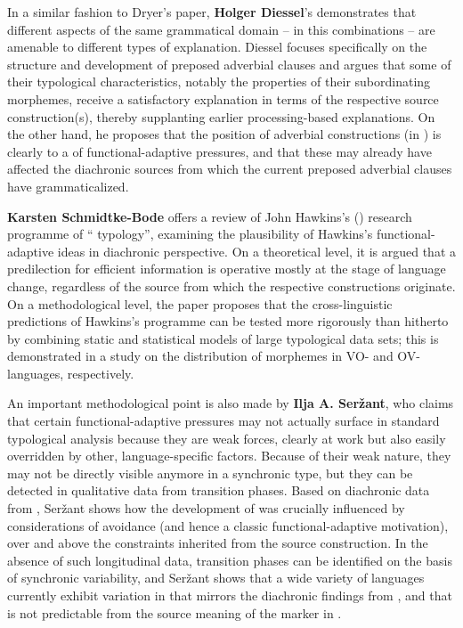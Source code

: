 \documentclass[output=paper]{langsci/langscibook}
\begin{document}
In a similar fashion to Dryer’s paper, \textbf{Holger Diessel}’s  demonstrates that different aspects of the same grammatical domain – in this   combinations – are amenable to different types of explanation. Diessel focuses specifically on the structure and development of preposed adverbial clauses and argues that some of their typological characteristics, notably the properties of their subordinating morphemes, receive a satisfactory explanation in terms of the respective source construction(s), thereby supplanting earlier processing-based explanations. On the other hand, he proposes that the position of adverbial constructions (in ) is clearly  to a  of functional-adaptive pressures, and that these may already have affected the diachronic sources from which the current preposed adverbial clauses have grammaticalized.

\textbf{Karsten Schmidtke-Bode} offers a review of John Hawkins's (\citeyear{Hawkins2004,Hawkins2014_VarEff}) research programme of “ typology”, examining the plausibility of Hawkins’s functional-adaptive ideas in diachronic perspective. On a theoretical level, it is argued that a predilection for efficient information  is operative mostly at the  stage of language change, regardless of the source from which the respective constructions originate. On a methodological level, the paper proposes that the cross-linguistic predictions of Hawkins’s programme can be tested more rigorously than hitherto by combining static and  statistical models of large typological data sets; this is demonstrated in a  study on the distribution of  morphemes in VO- and OV-languages, respectively.

An important methodological point is also made by \textbf{Ilja A. Seržant}, who claims that certain functional-adaptive pressures may not actually surface in standard typological analysis because they are weak forces, clearly at work but also easily overridden by other, language-specific factors. Because of their weak nature, they may not be directly visible anymore in a synchronic type, but they can be detected in qualitative data from transition phases. Based on diachronic data from , Seržant shows how the development of  was crucially influenced by considerations of  avoidance (and hence a classic functional-adaptive motivation), over and above the constraints inherited from the source construction. In the absence of such longitudinal data, transition phases can be identified on the basis of synchronic variability, and Seržant shows that a wide variety of languages currently exhibit variation in  that mirrors the diachronic findings from , and that is not predictable from the source meaning of the marker in .
\end{document}
